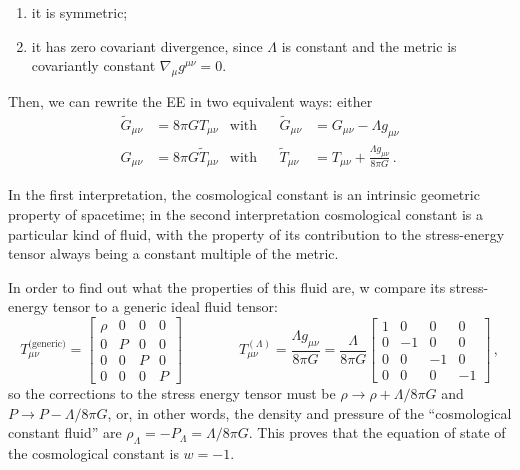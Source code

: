 \documentclass[main.tex]{subfiles}
\begin{document}
\begin{enumerate}
    \item it is symmetric;
    \item it has zero covariant divergence, since \(\Lambda \) is constant and the metric is covariantly constant \(\nabla_{\mu } g^{\mu \nu } = 0\).
\end{enumerate}

Then, we can rewrite the EE in two equivalent ways: either 
%
\begin{align}
\widetilde{G}_{\mu \nu } &= 8 \pi G T_{\mu \nu } &\text{with}&& \widetilde{G}_{\mu \nu } &= G_{\mu \nu } - \Lambda g_{\mu \nu }  \\
G_{\mu \nu } &= 8\pi G \widetilde{T}_{\mu \nu } &\text{with}&& 
\widetilde{T}_{\mu \nu } &= T_{\mu \nu } + \frac{\Lambda g_{\mu \nu }}{8 \pi G} 
\,.
\end{align}
%

In the first interpretation, the cosmological constant is an intrinsic geometric property of spacetime; in the second interpretation cosmological constant is a particular kind of fluid, with the property of its contribution to the stress-energy tensor always being a constant multiple of the metric. 

In order to find out what the properties of this fluid are, w compare its stress-energy tensor to a generic ideal fluid tensor: 
%
\begin{equation}
T_{\mu \nu }^{\text{(generic)}} = \left[\begin{array}{cccc}
\rho & 0 & 0 & 0 \\ 
0 & P & 0 & 0 \\ 
0 & 0 & P & 0 \\ 
0 & 0 & 0 & P
\end{array}\right]
\qquad \qquad
T^{(\Lambda )}_{\mu \nu } = \frac{\Lambda g_{\mu \nu }}{8 \pi G} = \frac{\Lambda}{8 \pi G} \left[\begin{array}{cccc}
1 & 0 & 0 & 0 \\ 
0 & -1 & 0 & 0 \\ 
0 & 0 & -1 & 0 \\ 
0 & 0 & 0 & -1
\end{array}\right]
\,,
\end{equation}
%
so the corrections to the stress energy tensor must be \(\rho \rightarrow \rho + \Lambda/ 8 \pi G \) and \(P \rightarrow P - \Lambda  / 8 \pi G\), or, in other words, the density and pressure of the ``cosmological constant fluid'' are \(\rho_{\Lambda } = - P_{\Lambda } = \Lambda/8\pi G\).
This proves that the equation of state of the cosmological constant is \(w = -1\).
\end{document}
